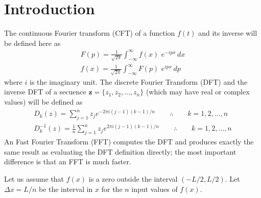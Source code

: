 \label{capitulo FCINO}

\section{Introduction}


The continuous Fourier transform (CFT) of a function $f(t)$ and its inverse will be defined here as
\begin{equation}
\begin{gathered}
F(p) = \frac{1}{\sqrt{2\pi}}\int_{-\infty}^{\infty} f(x)\,\, e^{-ipx}\,dx
\\
f(x) = \frac{1}{\sqrt{2\pi}}\int_{-\infty}^{\infty} F(p)\,\, e^{ipx}\,dp
\end{gathered}
\end{equation}
where $i$ is the imaginary unit. The discrete Fourier Transform (DFT) and the inverse DFT of a
secuence $\mathbf{z}=\{z_1,z_2,\ldots,z_n\}$ (which may have real or complex values) will be defined as
\begin{equation}
\begin{gathered}
D_k(z) = \sum_{j=1}^n z_j e^{-2\pi i(j-1)(k-1)/n}\qquad\therefore\qquad k=1,2,\ldots,n
\\
D_k^{-1}(z) = \frac{1}{n}\sum_{j=1}^n z_j e^{2\pi i(j-1)(k-1)/n}\qquad\therefore\qquad k=1,2,\ldots,n
\end{gathered}
\end{equation}
An Fast Fourier Transform (FFT) computes the DFT and produces exactly the same result as evaluating the DFT definition directly; the most important difference 
is that an FFT is much faster.

Let us assume that $f(x)$ is a zero outside the interval $(-L/2,L/2)$. Let $\Delta x=L/n$ be the interval in $x$ for the $n$ input values of $f(x)$.

